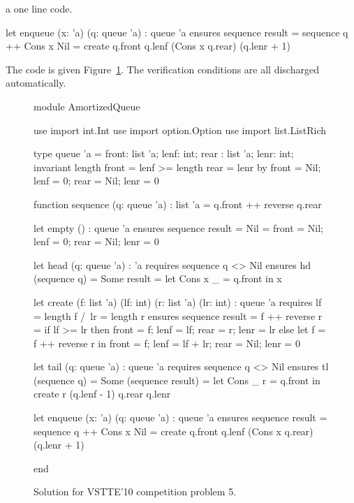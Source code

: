 a one line code.
\begin{whycode}
  let enqueue (x: 'a) (q: queue 'a) : queue 'a
    ensures { sequence result = sequence q ++ Cons x Nil }
  = create q.front q.lenf (Cons x q.rear) (q.lenr + 1)
\end{whycode}
The code is given Figure~\ref{fig:AQueue}.
The verification conditions are all discharged automatically.
\begin{figure}[p]
  \centering
\begin{whycode}
module AmortizedQueue

  use import int.Int
  use import option.Option
  use import list.ListRich

  type queue 'a = { front: list 'a; lenf: int;
                    rear : list 'a; lenr: int; }
    invariant { length front = lenf >= length rear = lenr }
    by { front = Nil; lenf = 0; rear = Nil; lenr = 0 }

  function sequence (q: queue 'a) : list 'a =
    q.front ++ reverse q.rear

  let empty () : queue 'a
    ensures { sequence result = Nil }
  = { front = Nil; lenf = 0; rear = Nil; lenr = 0 }

  let head (q: queue 'a) : 'a
    requires { sequence q <> Nil }
    ensures  { hd (sequence q) = Some result }
  = let Cons x _ = q.front in x

  let create (f: list 'a) (lf: int) (r: list 'a) (lr: int) : queue 'a
    requires { lf = length f /\ lr = length r }
    ensures  { sequence result = f ++ reverse r }
  = if lf >= lr then
      { front = f; lenf = lf; rear = r; lenr = lr }
    else
      let f = f ++ reverse r in
      { front = f; lenf = lf + lr; rear = Nil; lenr = 0 }

  let tail (q: queue 'a) : queue 'a
    requires { sequence q <> Nil }
    ensures  { tl (sequence q) = Some (sequence result) }
  = let Cons _ r = q.front in
    create r (q.lenf - 1) q.rear q.lenr

  let enqueue (x: 'a) (q: queue 'a) : queue 'a
    ensures { sequence result = sequence q ++ Cons x Nil }
  = create q.front q.lenf (Cons x q.rear) (q.lenr + 1)

end
\end{whycode}
\vspace*{-1em}%
  \caption{Solution for VSTTE'10 competition problem 5.}
  \label{fig:AQueue}
\end{figure}



